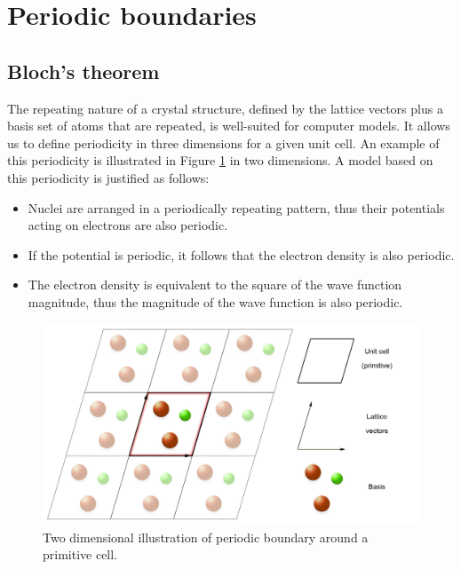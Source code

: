\section{Periodic boundaries}

\subsection{Bloch's theorem}

The repeating nature of a crystal structure, defined by the lattice vectors plus a basis set of atoms that are repeated, is well-suited for computer models. It allows us to define periodicity in three dimensions for a given unit cell. An example of this periodicity is illustrated in Figure \ref{figure:periodicboundary} in two dimensions. A model based on this periodicity is justified as follows:

\begin{itemize}
\item Nuclei are arranged in a periodically repeating pattern, thus their potentials acting on electrons are also periodic.
\item If the potential is periodic, it follows that the electron density is also periodic.
\item The electron density is equivalent to the square of the wave function magnitude, thus the magnitude of the wave function is also periodic.
\end{itemize}

\begin{figure}[ht] %
\begin{center}
\includegraphics[width=\linewidth]{images/PeriodicBoundaryThesis.png}
\end{center}
\caption{Two dimensional illustration of periodic boundary around a primitive cell.}
\label{figure:periodicboundary}
\end{figure}

